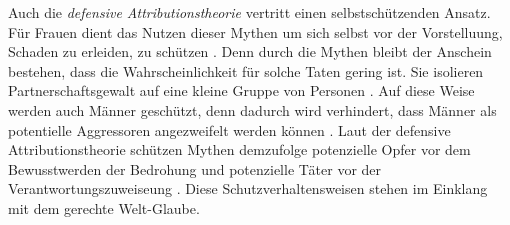 Auch die \textit{defensive Attributionstheorie} vertritt einen selbstschützenden Ansatz. Für Frauen dient das Nutzen dieser Mythen um sich selbst vor der Vorstelluung, Schaden zu erleiden, zu schützen \parencite{DVMAS, DVMAS_Peters}. Denn durch die Mythen bleibt der Anschein bestehen, dass die Wahrscheinlichkeit für solche Taten gering ist. Sie isolieren Partnerschaftsgewalt auf eine kleine Gruppe von Personen \parencite{DVMAS}. Auf diese Weise werden auch Männer geschützt, denn dadurch wird verhindert, dass Männer als potentielle Aggressoren angezweifelt werden können \parencite{DVMAS, DVMAS_Peters}. Laut der defensive Attributionstheorie schützen Mythen demzufolge potenzielle Opfer vor dem Bewusstwerden der Bedrohung und potenzielle Täter vor der Verantwortungszuweiseung \parencite{DVMAS_Peters}. Diese Schutzverhaltensweisen stehen im Einklang mit dem gerechte Welt-Glaube.